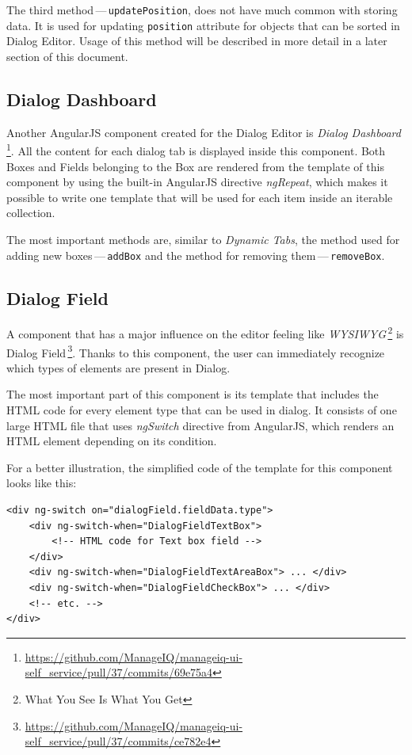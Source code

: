 The third method\,---\,{\tt updatePosition}, does not have much common with
storing data. It is used for updating {\tt position} attribute for objects that
can be sorted in Dialog Editor. Usage of this method will be described in more
detail in a later section of this document.

\subsection{Dialog Dashboard}

Another AngularJS component created for the Dialog Editor is
{\it Dialog Dashboard}\,\footnote{\url{https://github.com/ManageIQ/manageiq-ui-self_service/pull/37/commits/69e75a4}}.
All the content for each dialog tab is displayed inside this component.
Both Boxes and Fields belonging to the Box are rendered
from the template of this component by using the built-in AngularJS directive
{\it ngRepeat}, which makes it possible to write one template that will be
used for each item inside an iterable collection.

The most important methods are, similar to {\it Dynamic Tabs}, the method used
for adding new boxes\,---\,{\tt addBox} and the method for removing
them\,---\,{\tt removeBox}.

\subsection{Dialog Field}

A component that has a major influence on the editor feeling like
{\it WYSIWYG}\,\footnote{What You See Is What You Get} is Dialog
Field\,\footnote{\url{https://github.com/ManageIQ/manageiq-ui-self_service/pull/37/commits/ce782e4}}.
Thanks to this component, the user can immediately recognize which types of
elements are present in Dialog.

The most important part of this component is its template that includes the
HTML code for every element type that can be used in dialog.
It consists of one large HTML file that uses {\it ngSwitch} directive from
AngularJS, which renders an HTML element depending on its condition.

For a better illustration, the simplified code of the template for this
component looks like this:
\begin{lstlisting}
<div ng-switch on="dialogField.fieldData.type">
    <div ng-switch-when="DialogFieldTextBox">
        <!-- HTML code for Text box field -->
    </div>
    <div ng-switch-when="DialogFieldTextAreaBox"> ... </div>
    <div ng-switch-when="DialogFieldCheckBox"> ... </div>
    <!-- etc. -->
</div>
\end{lstlisting}

